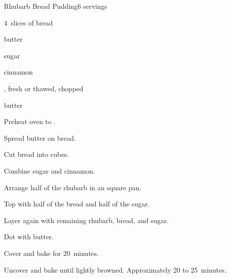 \begin{recipe}{Rhubarb Bread Pudding}{}{6 servings}

\begin{ingredients}
\item 4~slices of bread
\item {} butter
\item {} sugar
\item \tp{\half} cinnamon
\item {} , fresh or thawed, chopped
\item \Tp{1\twothird} butter
\end{ingredients}

\begin{directions}
\item Preheat oven to .
\item Spread butter on bread.
\item Cut bread into \inch{\half} cubes.
\item Combine sugar and cinnamon.
\item Arrange half of the rhubarb in an  square pan.
\item Top with half of the bread and half of the sugar.
\item Layer again with remaining rhubarb, bread, and sugar.
\item Dot with butter.
\item Cover and bake for 20~minutes.
\item Uncover and bake until lightly browned. Approximately 20 to 25~minutes.
\end{directions}

\end{recipe}
